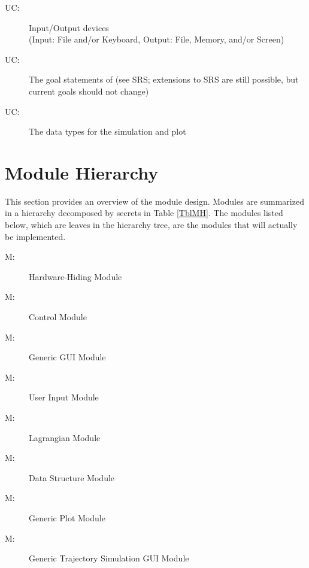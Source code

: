 \documentclass[12pt, titlepage]{article}
\newcounter{ucnum}
\newcommand{\uctheucnum}{UC\theucnum}
\newcounter{mnum}
\newcommand{\mthemnum}{M\themnum}
\begin{document}
\begin{description}
\item[ \uctheucnum \label{ucIO}:] Input/Output devices\\
  (Input: File and/or Keyboard, Output: File, Memory, and/or Screen)
\item[ \uctheucnum \label{ucGoal}:] The goal statements 
 of \progname (see SRS; extensions to SRS are still possible, but current goals
 should not change)
\item[ \uctheucnum \label{ucData}:] The data types 
 for the simulation and plot 
\end{description}

\section{Module Hierarchy} \label{SecMH}

This section provides an overview of the module design. Modules are summarized
in a hierarchy decomposed by secrets in Table \ref{TblMH}. The modules listed
below, which are leaves in the hierarchy tree, are the modules that will
actually be implemented.

\begin{description}
\item [ \mthemnum \label{mHH}:] Hardware-Hiding Module 

\item [ \mthemnum \label{mCM}:] \progname Control Module 

\item [ \mthemnum \label{mGM}:] Generic GUI Module 

\item [ \mthemnum \label{mIM}:] User Input Module 

\item [ \mthemnum \label{mLM}:] Lagrangian Module 

\item [ \mthemnum \label{mDM}:] Data Structure Module 

\item [ \mthemnum \label{mPM}:] Generic Plot Module 

\item [ \mthemnum \label{mTM}:] Generic Trajectory 
Simulation GUI Module 
\end{description}
\end{document}
